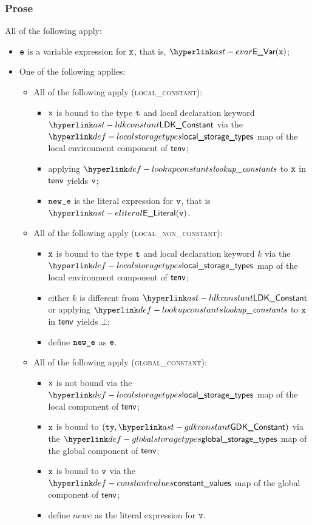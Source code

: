 \subsubsection{Prose}
All of the following apply:
\begin{itemize}
  \item $\texttt{e}$ is a variable expression for $\texttt{x}$, that is, $\EVar(\vx)$;
  \item One of the following applies:
  \begin{itemize}
    \item All of the following apply (\textsc{local\_constant}):
    \begin{itemize}
    \item $\texttt{x}$ is bound to the type $\texttt{t}$ and local declaration keyword $\LDKConstant$
          via the $\localstoragetypes$ map of the local environment component of $\textsf{tenv}$;
    \item applying $\lookupconstants$ to $\texttt{x}$ in $\textsf{tenv}$ yields $\texttt{v}$;
    \item $\texttt{new\_e}$ is the literal expression for $\texttt{v}$, that is $\eliteral{\vv}$.
    \end{itemize}

    \item All of the following apply (\textsc{local\_non\_constant}):
    \begin{itemize}
    \item $\texttt{x}$ is bound to the type $\texttt{t}$ and local declaration keyword $k$
          via the \\
          $\localstoragetypes$ map of the local environment component of $\textsf{tenv}$;
    \item either $k$ is different from $\LDKConstant$ or applying $\lookupconstants$ to $\texttt{x}$ in $\textsf{tenv}$ yields $\bot$;
    \item define $\texttt{new\_e}$ as $\texttt{e}$.
    \end{itemize}

    \item All of the following apply (\textsc{global\_constant}):
    \begin{itemize}
    \item $\texttt{x}$ is not bound via the $\localstoragetypes$ map of the local component of $\textsf{tenv}$;
    \item $\texttt{x}$ is bound to $(\tty, \GDKConstant)$ via the $\globalstoragetypes$ map of the global component of $\textsf{tenv}$;
    \item $\texttt{x}$ is bound to $\texttt{v}$ via the $\constantvalues$ map of the global component of $\textsf{tenv}$;
    \item define $newe$ as the literal expression for $\texttt{v}$.
    \end{itemize}


\end{itemize}
\end{itemize}
